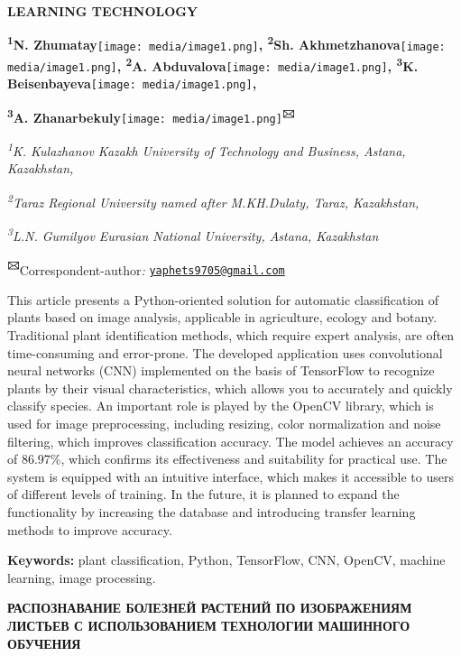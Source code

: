 \documentclass[
]{article}
\begin{document}
\textbf{LEARNING TECHNOLOGY}

\textbf{\textsuperscript{1}N.
Zhumatay}\texttt{[image: media/image1.png]}\textbf{,
\textsuperscript{2}Sh.
Akhmetzhanova}\texttt{[image: media/image1.png]}\textbf{,
\textsuperscript{2}A.
Abduvalova}\texttt{[image: media/image1.png]}\textbf{,
\textsuperscript{3}K.
Beisenbayeva}\texttt{[image: media/image1.png]}\textbf{,}

\textbf{\textsuperscript{3}A.
Zhanarbekuly}\texttt{[image: media/image1.png]}\textbf{\textsuperscript{🖂}}

\emph{\textsuperscript{1}K. Kulazhanov Kazakh University of Technology
and Business, Astana, Kazakhstan,}

\emph{\textsuperscript{2}Taraz Regional University named after
M.KH.Dulaty, Taraz, Kazakhstan,}

\emph{\textsuperscript{3}L.N. Gumilyov Eurasian National University,
Astana, Kazakhstan}

\textbf{\textsuperscript{🖂}}Correspondent-author\emph{:}
\href{mailto:yaphets9705@gmail.com}{\nolinkurl{yaphets9705@gmail.com}}

This article presents a Python-oriented solution for automatic
classification of plants based on image analysis, applicable in
agriculture, ecology and botany. Traditional plant identification
methods, which require expert analysis, are often time-consuming and
error-prone. The developed application uses convolutional neural
networks (CNN) implemented on the basis of TensorFlow to recognize
plants by their visual characteristics, which allows you to accurately
and quickly classify species. An important role is played by the OpenCV
library, which is used for image preprocessing, including resizing,
color normalization and noise filtering, which improves classification
accuracy. The model achieves an accuracy of 86.97\%, which confirms its
effectiveness and suitability for practical use. The system is equipped
with an intuitive interface, which makes it accessible to users of
different levels of training. In the future, it is planned to expand the
functionality by increasing the database and introducing transfer
learning methods to improve accuracy.

\textbf{Keywords:} plant classification, Python, TensorFlow, CNN,
OpenCV, machine learning, image processing.

\textbf{РАСПОЗНАВАНИЕ БОЛЕЗНЕЙ РАСТЕНИЙ ПО ИЗОБРАЖЕНИЯМ ЛИСТЬЕВ С
ИСПОЛЬЗОВАНИЕМ ТЕХНОЛОГИИ МАШИННОГО ОБУЧЕНИЯ}
\end{document}
